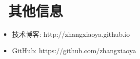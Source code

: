 \documentclass{resume}
\begin{document}

\section{\faInfo\ 其他信息}
\begin{itemize}[parsep=0.5ex]
  \item 技术博客: http://zhangxiaoya.github.io
  \item GitHub: https://github.com/zhangxiaoya
\end{itemize}
\end{document}
